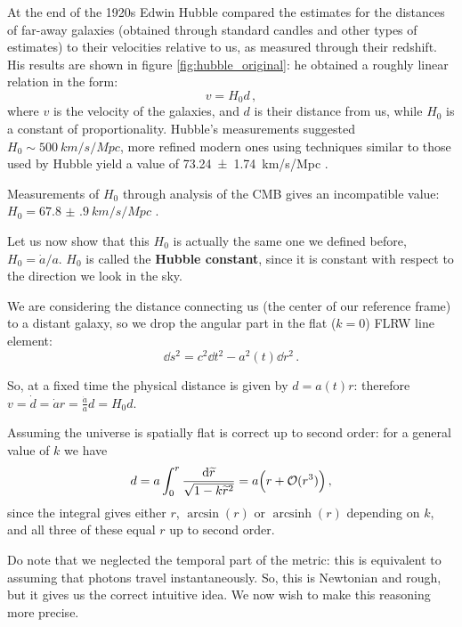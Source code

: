 \documentclass[main.tex]{subfiles}
\begin{document}
At the end of the 1920s Edwin Hubble compared the estimates for the distances of far-away galaxies (obtained through standard candles and other types of estimates) to their velocities relative to us, as measured through their redshift. His results are shown in figure \ref{fig:hubble_original}: he obtained a roughly linear relation in the form:
%
\begin{equation}
  v = H_0 d\,,
\end{equation}
%
where \(v\) is the velocity of the galaxies, and \(d\) is their distance from us, while \(H_0 \) is a constant of proportionality.
Hubble's measurements suggested \(H_0 \sim \SI{500}{km/s/Mpc}\), more refined modern ones using techniques similar to those used by Hubble yield a value of \SI{73.24(174)}{km/s/Mpc} \cite{riessDeterminationLocalValue2016}.

Measurements of \(H_0 \) through analysis of the CMB gives an incompatible value: \(H_0 = \SI{67.8(9)}{km/s/Mpc}\) \cite{adePlanck2015Results2016}.


Let us now show that this \(H_0 \) is actually the same one we defined before, \(H_0 = \dot{a} / a\).
\(H_0 \) is called the \textbf{Hubble constant}, since it is constant with respect to the direction we look in the sky.


We are considering the distance connecting us (the center of our reference frame) to a distant galaxy, so we drop the angular part in the flat (\(k = 0\)) FLRW line element:
%
\begin{equation}
  \dd{s^2} = c^2 \dd{t^2} - a^2(t) \dd{r^2}
  \,.
\end{equation}

So, at a fixed time the physical distance is given by \(d = a(t) r\): therefore \(v = \dot{d} = \dot{a}r = \frac{\dot{a} }{a} d = H_0 d\). 

Assuming the universe is spatially flat is correct up to second order: for a general value of \(k\) we have 
%
\begin{align}
d = a \int_{0}^{r} \frac{ \dd{\widetilde{r}} }{\sqrt{1 - k \widetilde{r}^2}} = a  \qty( r + \mathcal{O}(r^3))
\,,
\end{align}
%
since the integral gives either \(r\), \(\arcsin(r)\) or \(\operatorname{arcsinh}(r)\) depending on \(k\), and all three of these equal \(r\) up to second order.

Do note that we neglected the temporal part of the metric: this is equivalent to assuming that photons travel instantaneously.
So, this is Newtonian and rough, but it gives us the correct intuitive idea.
We now wish to make this reasoning more precise.
\end{document}

